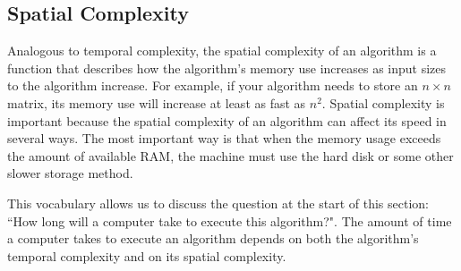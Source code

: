 \subsection*{Spatial Complexity}
Analogous to temporal complexity, the spatial complexity of an algorithm is a function that describes how the algorithm's memory use increases as input sizes to the algorithm increase. For example, if your algorithm needs to store an $n \times n$ matrix, its memory use will increase at least as fast as $n^2$. Spatial complexity is important because  the spatial complexity of an algorithm can affect its speed in several ways. The most important way is that when the memory usage exceeds the amount of available RAM, the machine must use the hard disk or some other slower storage method.

This vocabulary allows us to discuss the question at the start of this section: ``How long will a computer take to execute this algorithm?". The amount of time a computer takes to execute an algorithm depends on both the algorithm's temporal complexity and on its spatial complexity. 


